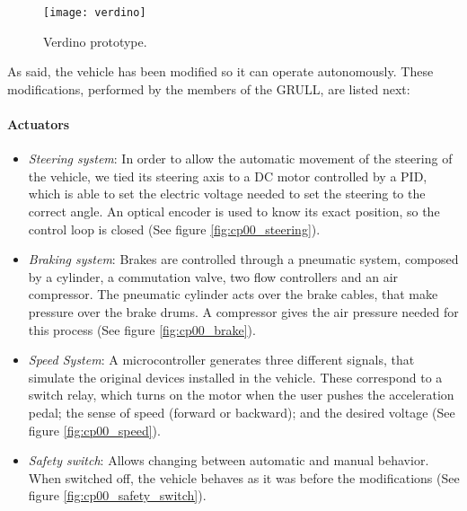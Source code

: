 \begin{figure}[h!]
  \centering
  \texttt{[image: verdino]}
  \caption{Verdino prototype.}\label{fig:cp00_verdino}
\end{figure}

As said, the vehicle has been modified so it can operate autonomously. These modifications, performed by the members of the GRULL, are listed next:

\paragraph{Actuators}\label{ch:chapter00_03_00_00_01}
\begin{itemize}
 \item \emph{Steering system}: In order to allow the automatic movement of the steering of the vehicle, we tied its steering axis to a DC motor controlled by a \ac{PID}, which is able to set the electric voltage needed to set the steering to the correct angle. An optical encoder is used to know its exact position, so the control loop is closed (See figure \ref{fig:cp00_steering}).
 \item \emph{Braking system}: Brakes are controlled through a pneumatic system, composed by a cylinder, a commutation valve, two flow controllers and an air compressor. The pneumatic cylinder acts over the brake cables, that make pressure over the brake drums. A compressor gives the air pressure needed for this process (See figure \ref{fig:cp00_brake}).
 \item \emph{Speed System}: A microcontroller generates three different signals, that simulate the original devices installed in the vehicle. These correspond to a switch relay, which turns on the motor when the user pushes the acceleration pedal; the sense of speed (forward or backward); and the desired voltage (See figure \ref{fig:cp00_speed}).
 \item \emph{Safety switch}: Allows changing between automatic and manual behavior. When switched off, the vehicle behaves as it was before the modifications (See figure \ref{fig:cp00_safety_switch}).
\end{itemize}

